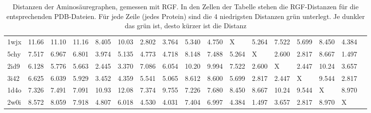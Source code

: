 \documentclass{report}
\begin{document}
\begin{table}
{\begin{tabular}{l l l l l l l l l l l l l l l l l}
1wjx & 11.66 & 11.10 & 11.16 & 8.405 & 10.03 & \cellcolor{fGreen!100}2.802 & \cellcolor{fGreen!75}3.764 & 5.340 & \cellcolor{fGreen!25}4.750 &   X   & 5.264 & 7.522 & 5.699 & 8.450 & \cellcolor{fGreen!50}4.384 &  \\
5chy & 7.517 & 6.967 & 6.801 & \cellcolor{fGreen!25}3.974 & 5.135 & 4.773 & 4.718 & 8.148 & 7.488 & 5.264 &   X   & \cellcolor{fGreen!75}2.600 & \cellcolor{fGreen!50}2.817 & 8.667 & \cellcolor{fGreen!100}1.497 &  \\
2id9 & 6.128 & 5.776 & 5.663 & \cellcolor{fGreen!100}2.445 & \cellcolor{fGreen!25}3.370 & 7.086 & 6.054 & 10.20 & 9.994 & 7.522 & \cellcolor{fGreen!50}2.600 &   X   & \cellcolor{fGreen!75}2.447 & 10.24 & 3.657 &  \\
3i42 & 6.625 & 6.039 & 5.929 & \cellcolor{fGreen!25}3.452 & 4.359 & 5.541 & 5.065 & 8.612 & 8.600 & 5.699 & \cellcolor{fGreen!75}2.817 & \cellcolor{fGreen!100}2.447 &   X   & 9.544 & \cellcolor{fGreen!50}2.817 &  \\
1d4o & \cellcolor{fGreen!50}7.326 & 7.491 & \cellcolor{fGreen!100}7.091 & 10.93 & 12.08 & \cellcolor{fGreen!25}7.374 & 9.755 & \cellcolor{fGreen!75}7.226 & 7.680 & 8.450 & 8.667 & 10.24 & 9.544 &   X   & 8.970 &  \\
2w0i & 8.572 & 8.059 & 7.918 & 4.807 & 6.018 & 4.530 & \cellcolor{fGreen!25}4.031 & 7.404 & 6.997 & 4.384 & \cellcolor{fGreen!100}1.497 & \cellcolor{fGreen!50}3.657 & \cellcolor{fGreen!75}2.817 & 8.970 &   X   &  \\



\end{tabular}}
\caption{Distanzen der Aminos\"auregraphen, gemessen mit RGF. In den Zellen der Tabelle stehen die RGF-Distanzen f\"ur die entsprechenden PDB-Dateien. F\"ur jede Zeile (jedes Protein) sind die 4 niedrigsten Distanzen gr\"un unterlegt. Je dunkler das gr\"un ist, desto k\"urzer ist die Distanz}
\end{table}
\end{document}
